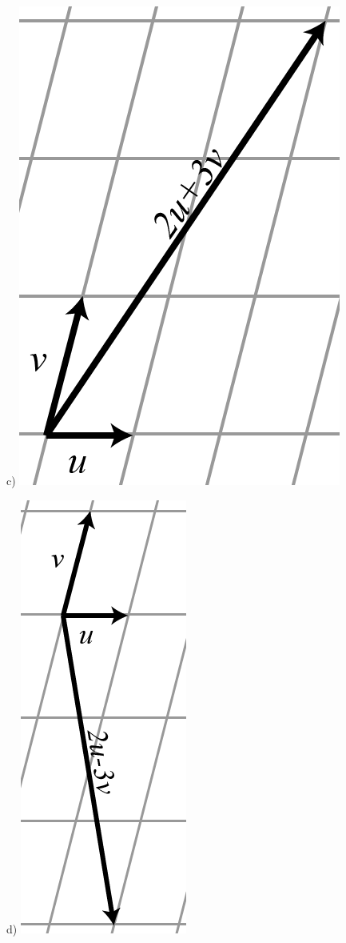 \begin{task}{c)}
	\includegraphics[scale=0.3]{images/21c.PNG}
\end{task}

\begin{task}{d)}
	\includegraphics[scale=0.3]{images/21d.PNG}
\end{task}


